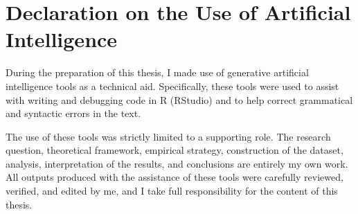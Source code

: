 \section*{Declaration on the Use of Artificial Intelligence}
During the preparation of this thesis, I made use of generative artificial intelligence tools as a technical aid. Specifically, these tools were used to assist with writing and debugging code in R (RStudio) and to help correct grammatical and syntactic errors in the text.

The use of these tools was strictly limited to a supporting role. The research question, theoretical framework, empirical strategy, construction of the dataset, analysis, interpretation of the results, and conclusions are entirely my own work. All outputs produced with the assistance of these tools were carefully reviewed, verified, and edited by me, and I take full responsibility for the content of this thesis.